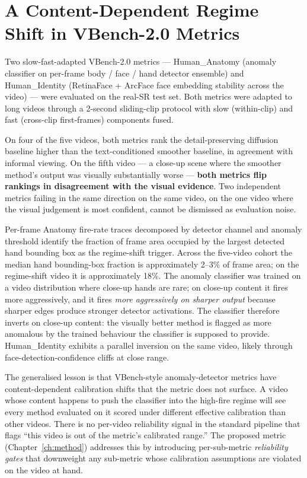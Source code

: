 \section{A Content-Dependent Regime Shift in VBench-2.0 Metrics}
\label{sec:problem:regime}

Two slow-fast-adapted VBench-2.0 metrics --- Human\_Anatomy (anomaly classifier on
per-frame body / face / hand detector ensemble) and Human\_Identity (RetinaFace + ArcFace
face embedding stability across the video) --- were evaluated on the real-SR test set.
Both metrics were adapted to long videos through a 2-second sliding-clip protocol with
slow (within-clip) and fast (cross-clip first-frames) components fused.

On four of the five videos, both metrics rank the detail-preserving diffusion baseline
higher than the text-conditioned smoother baseline, in agreement with informal viewing.
On the fifth video --- a close-up scene where the smoother method's output was visually
substantially worse --- \textbf{both metrics flip rankings in disagreement with the
visual evidence}. Two independent metrics failing in the same direction on the same
video, on the one video where the visual judgement is most confident, cannot be dismissed
as evaluation noise.

Per-frame Anatomy fire-rate traces decomposed by detector channel and anomaly threshold
identify the fraction of frame area occupied by the largest detected hand bounding box as
the regime-shift trigger. Across the five-video cohort the median hand bounding-box
fraction is approximately 2--3\% of frame area; on the regime-shift video it is
approximately 18\%. The anomaly classifier was trained on a video distribution where
close-up hands are rare; on close-up content it fires more aggressively, and it fires
\emph{more aggressively on sharper output} because sharper edges produce stronger
detector activations. The classifier therefore inverts on close-up content: the visually
better method is flagged as more anomalous by the trained behaviour the classifier is
supposed to provide. Human\_Identity exhibits a parallel inversion on the same video,
likely through face-detection-confidence cliffs at close range.

The generalised lesson is that VBench-style anomaly-detector metrics have
content-dependent calibration shifts that the metric does not surface. A video whose
content happens to push the classifier into the high-fire regime will see every method
evaluated on it scored under different effective calibration than other videos. There is
no per-video reliability signal in the standard pipeline that flags ``this video is out
of the metric's calibrated range.'' The proposed metric (Chapter~\ref{ch:method})
addresses this by introducing per-sub-metric \emph{reliability gates} that downweight any
sub-metric whose calibration assumptions are violated on the video at hand.

